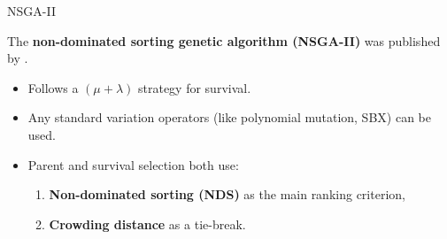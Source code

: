 \documentclass[11pt,compress,t,notes=noshow,xcolor=table]{beamer}
\begin{document}
\begin{vbframe}{NSGA-II}

The \textbf{non-dominated sorting genetic algorithm (NSGA-II)} was published by
.

\begin{itemize}
\item Follows a $(\mu + \lambda)$ strategy for survival.
\item Any standard variation operators (like polynomial mutation, SBX) can be used.
\item Parent and survival selection both use:
  \begin{enumerate}
    \item \textbf{Non-dominated sorting (NDS)} as the main ranking criterion,
    \item \textbf{Crowding distance} as a tie-break.
  \end{enumerate}
\end{itemize}

\end{vbframe}
\end{document}

